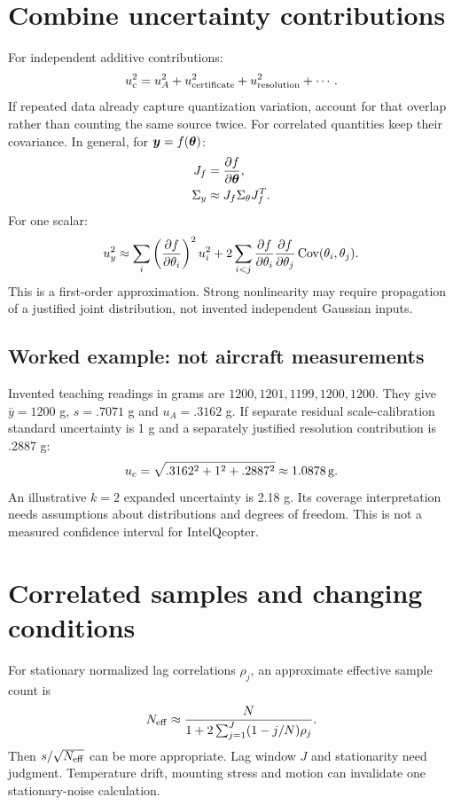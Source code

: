 \section{Combine uncertainty contributions}
For independent additive contributions:
\begin{equation}
u_c^2=u_A^2+u_{\rm certificate}^2+u_{\rm resolution}^2+\cdots.
\end{equation}
If repeated data already capture quantization variation, account for that overlap
rather than counting the same source twice. For correlated quantities keep their
covariance. In general, for $\bm{y}=f(\bm{\theta})$:
\begin{align}
J_f&=\frac{\partial f}{\partial\bm{\theta}},\\
\Sigma_y&\approx J_f\Sigma_\theta J_f^T.
\end{align}
For one scalar:
\begin{equation}
u_y^2\approx\sum_i
\left(\frac{\partial f}{\partial\theta_i}\right)^2u_i^2
 +2\sum_{i<j}\frac{\partial f}{\partial\theta_i}
\frac{\partial f}{\partial\theta_j}\operatorname{Cov}(\theta_i,\theta_j).
\end{equation}
This is a first-order approximation. Strong nonlinearity may require propagation
of a justified joint distribution, not invented independent Gaussian inputs.

\subsection{Worked example: not aircraft measurements}
Invented teaching readings in grams are $1200,1201,1199,1200,1200$.
They give $\bar y=1200$ g, $s=.7071$ g and $u_A=.3162$ g.
If separate residual scale-calibration standard uncertainty is 1 g and a
separately justified resolution contribution is .2887 g:
\begin{equation}
u_c=\sqrt{.3162^2+1^2+.2887^2}\approx1.0878\,\mathrm{g}.
\end{equation}
An illustrative $k=2$ expanded uncertainty is 2.18 g. Its coverage interpretation
needs assumptions about distributions and degrees of freedom. This is not a measured
confidence interval for IntelQcopter.

\section{Correlated samples and changing conditions}
For stationary normalized lag correlations $\rho_j$, an approximate effective
sample count is
\begin{equation}
N_{\rm eff}\approx\frac{N}{1+2\sum_{j=1}^J(1-j/N)\rho_j}.
\end{equation}
Then $s/\sqrt{N_{\rm eff}}$ can be more appropriate. Lag window $J$ and
stationarity need judgment. Temperature drift, mounting stress and motion can
invalidate one stationary-noise calculation.

